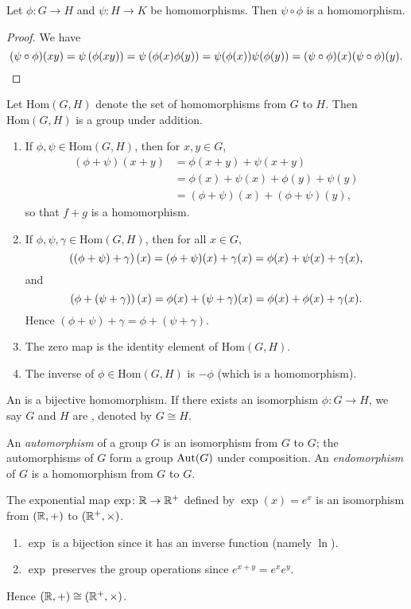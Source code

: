 \begin{lemma}
Let $\phi\colon G\to H$ and $\psi\colon H\to K$ be homomorphisms. Then $\psi\circ\phi$ is a homomorphism.
\end{lemma}

\begin{proof}
We have
\[(\psi\circ\phi)(xy)=\psi\left(\phi(xy)\right)=\psi\left(\phi(x)\phi(y)\right)=\psi(\phi(x))\psi(\phi(y))=(\psi\circ\phi)(x)(\psi\circ\phi)(y).\]
\end{proof}

Let $\mathrm{Hom}(G,H)$ denote the set of homomorphisms from $G$ to $H$. 
Then $\mathrm{Hom}(G,H)$ is a group under addition. 
\begin{enumerate}[label=(\roman*)]
\item If $\phi,\psi\in\mathrm{Hom}(G,H)$, then for $x,y\in G$,
\begin{align*}
(\phi+\psi)(x+y)
&=\phi(x+y)+\psi(x+y)\\
&=\phi(x)+\psi(x)+\phi(y)+\psi(y)\\
&=(\phi+\psi)(x)+(\phi+\psi)(y),
\end{align*}
so that $f+g$ is a homomorphism.

\item If $\phi,\psi,\gamma\in\mathrm{Hom}(G,H)$, then for all $x\in G$,
\[\left((\phi+\psi)+\gamma\right)(x)=(\phi+\psi)(x)+\gamma(x)=\phi(x)+\psi(x)+\gamma(x),\]
and
\[\left(\phi+(\psi+\gamma)\right)(x)=\phi(x)+(\psi+\gamma)(x)=\phi(x)+\phi(x)+\gamma(x).\]
Hence $(\phi+\psi)+\gamma=\phi+(\psi+\gamma)$.

\item The zero map is the identity element of $\mathrm{Hom}(G,H)$.

\item The inverse of $\phi\in\mathrm{Hom}(G,H)$ is $-\phi$ (which is a homomorphism).
\end{enumerate}

\begin{definition}[Isomorphism]
An  is a bijective homomorphism. 
If there exists an isomorphism $\phi\colon G\to H$, we say $G$ and $H$ are , denoted by $G\cong H$.
\end{definition}

An \emph{automorphism} of a group $G$ is an isomorphism from $G$ to $G$; the automorphisms of $G$ form a group $\operatorname{Aut}(G)$ under composition. An \emph{endomorphism} of $G$ is a homomorphism from $G$ to $G$.

\begin{example}
The exponential map $\exp\colon\mathbb R\to\mathbb R^+$ defined by $\exp(x)=e^x$ is an isomorphism from $(\mathbb R,+)$ to $(\mathbb R^+,\times)$.
\begin{enumerate}[label=(\roman*)]
\item $\exp$ is a bijection since it has an inverse function (namely $\ln$).
\item $\exp$ preserves the group operations since $e^{x+y}=e^xe^y$.
\end{enumerate}
Hence $(\mathbb R,+)\cong(\mathbb R^+,\times)$.
\end{example}

